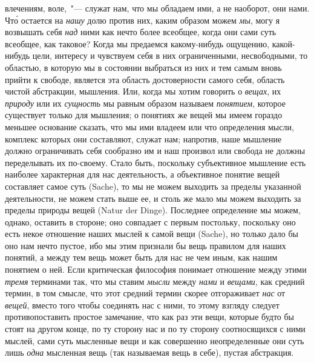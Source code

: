 влечениям, воле,~"--- служат нам, что мы обладаем ими, а
не наоборот, они нами. Чт\'о остается на \emph{нашу} долю против
них, каким образом можем \emph{мы}, могу я возвышать
себя \emph{над} ними как нечто более всеобщее, когда они сами
суть всеобщее, как таковое? Когда мы предаемся какому-нибудь
ощущению, какой-нибудь цели, интересу и чувствуем
себя в них ограниченными, несвободными, то областью,
в которую мы в состоянии выбраться из них и тем
самым вновь прийти к свободе, является эта область достоверности
самого себя, область чистой абстракции,
мышления. Или, когда мы хотим говорить о \emph{вещах}, их
\emph{природу} или их \emph{сущность} мы равным образом называем
\emph{понятием}, которое существует только для мышления; о
понятиях же вещей мы имеем гораздо меньшее основание
сказать, что мы ими владеем или что определения
мысли, комплекс которых они составляют, служат нам;
напротив, наше мышление должно ограничивать себя сообразно
им и наш произвол или свобода не должны
переделывать их по-своему. Стало быть, поскольку субъективное
мышление есть наиболее характерная для нас
деятельность, а объективное понятие вещей составляет
самое суть (Sache), то мы не можем выходить за пределы
указанной деятельности, не можем стать выше ее, и столь
же мало мы можем выходить за пределы природы вещей
(Natur der Dinge). Последнее определение мы можем, однако,
оставить в стороне; оно совпадает с первым постольку,
поскольку оно есть некое отношение наших мыслей
к самой вещи (Sache), но только дало бы оно нам
нечто пустое, ибо мы этим признали бы вещь правилом
для наших понятий, а между тем вещь может быть для
нас не чем иным, как нашим понятием о ней. Если критическая
философия понимает отношение между этими
\emph{тремя} терминами так, что мы ставим \emph{мысли} между \emph{нами}
и \emph{вещами}, как средний термин, в том смысле, что этот
средний термин скорее отгораживает \emph{нас} от \emph{вещей},
вместо того чтобы соединять нас с ними, то этому взгляду
следует противопоставить простое замечание, что как раз
эти вещи, которые будто бы стоят на другом конце, по
ту сторону нас и по ту сторону соотносящихся с ними
мыслей, сами суть мысленные вещи и как совершенно
неопределенные они суть лишь \emph{одна} мысленная вещь
(так называемая вещь в себе), пустая абстракция.


